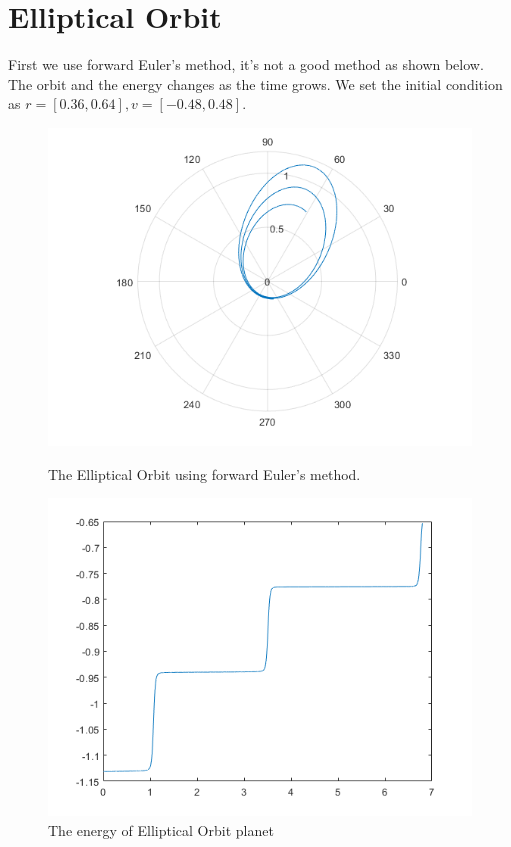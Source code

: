 \documentclass{article}
\begin{document}
\section{Elliptical Orbit}
First we use forward Euler's method, it's not a good method as shown below. The orbit and the energy changes as the time grows. We set the initial condition as $r=[0.36,0.64],v=[-0.48,0.48]$.
\begin{figure}[htbp]
    \centering
    \begin{minipage}{0.45\linewidth}
        \centering
        \includegraphics[width=0.8\linewidth]{br1.png}
        \caption{The Elliptical Orbit using forward Euler's method.}
    \end{minipage}
    \hfill
    \begin{minipage}{0.45\linewidth}
        \centering
        \includegraphics[width=0.8\linewidth]{br11.png}
        \caption{The energy of Elliptical Orbit planet}
    \end{minipage}
\end{figure}
\end{document}
